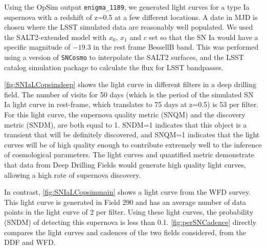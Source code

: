 Using the OpSim output \texttt{enigma\_1189}, we generated
light curves for a type Ia supernova with a redshift of z=0.5 at a few different
locations. A date in MJD is chosen where the LSST simulated data are
reasonably well populated. We used the SALT2-extended model
with $x_0$, $x_1$ and $c$ set so that the SN Ia would have a specific
magnitude of $-19.3$ in the rest frame BessellB band. This was performed
using a version of \texttt{SNCosmo} to interpolate the SALT2 surfaces, and the
LSST catalog simulation package to calculate the flux for LSST
bandpasses.


\autoref{fig:SNIaLCopsimdeep} shows the light curve in
different filters in a deep drilling field. The
number of visits for 50 days (which is the period of the simulated SN Ia light curve in
rest-frame, which translates to 75 days at z=0.5) is 53 per filter. For this light
curve, the supernova quality metric (SNQM) and the
discovery metric (SNDM), are both equal to 1. SNDM=1 indicates that this object is a transient that
will be definitely discovered, and SNQM=1 indicates that the light
curves will be of high quality enough to contribute extremely well to
the inference of cosmological parameters. The light curves and
quantified metric demonstrate that data from Deep Drilling Fields would
generate high quality light curves, allowing a high rate of supernova
discovery.

In contrast, \autoref{fig:SNIaLCopsimmain} shows a light curve from the WFD survey. This light
curve is
generated in Field 290 and has an average number
of data points in the light curve of 2 per filter. Using these light
curves, the probability (SNDM) of detecting this supernova is less
than 0.1. \autoref{fig:perSNCadence} directly compares the light curves and cadences of the two
fields considered, from the DDF and WFD.

